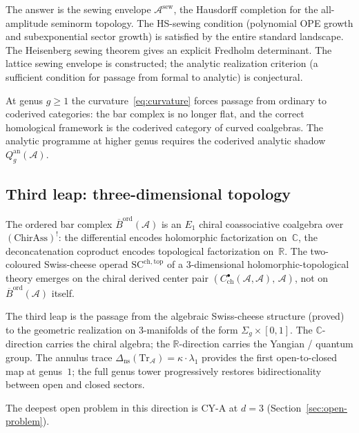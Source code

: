 \documentclass[11pt,reqno]{amsart}
\theoremstyle{definition}
\theoremstyle{remark}
\newcommand{\cA}{\mathcal{A}}
\newcommand{\barB}{\overline{B}}
\numberwithin{equation}{section}
\begin{document}
The answer is the sewing envelope $\cA^{\mathrm{sew}}$,
the Hausdorff completion for the all-amplitude seminorm
topology. The HS-sewing condition (polynomial OPE growth
and subexponential sector growth) is satisfied by the
entire standard landscape. The Heisenberg sewing theorem
gives an explicit Fredholm determinant. The lattice
sewing envelope is constructed; the analytic realization
criterion (a sufficient condition for passage from
formal to analytic) is conjectural.

At genus $g \ge 1$ the curvature~\eqref{eq:curvature}
forces passage from ordinary to coderived categories:
the bar complex is no longer flat, and the correct
homological framework is the coderived category of
curved coalgebras. The analytic programme at higher genus
requires the coderived analytic shadow
$Q_g^{\mathrm{an}}(\cA)$.


\subsection{Third leap: three-dimensional topology}
\label{ssec:3d}

The ordered bar complex
$\barB^{\mathrm{ord}}(\cA)$ is an $E_1$ chiral
coassociative coalgebra over $(\mathrm{ChirAss})^!$:
the differential encodes holomorphic factorization
on~$\mathbb{C}$, the deconcatenation coproduct encodes
topological factorization on~$\mathbb{R}$. The
two-coloured Swiss-cheese operad
$\mathrm{SC}^{\mathrm{ch,top}}$ of a $3$-dimensional
holomorphic-topological theory emerges on the chiral
derived center pair
$(C^\bullet_{\mathrm{ch}}(\cA,\cA),\, \cA)$, not
on~$\barB^{\mathrm{ord}}(\cA)$ itself.

The third leap is the passage from the algebraic
Swiss-cheese structure (proved) to the geometric
realization on $3$-manifolds of the form
$\Sigma_g \times [0,1]$. The $\mathbb{C}$-direction
carries the chiral algebra; the $\mathbb{R}$-direction
carries the Yangian / quantum group. The annulus trace
$\Delta_{\mathrm{ns}}(\mathrm{Tr}_\cA) =
\kappa \cdot \lambda_1$
provides the first open-to-closed map at genus~$1$;
the full genus tower progressively restores
bidirectionality between open and closed sectors.

The deepest open problem in this direction is CY-A at
$d = 3$ (Section~\ref{sec:open-problem}).


\end{document}
